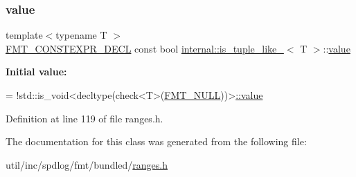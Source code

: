 \subsubsection{\texorpdfstring{value}{value}}
{\footnotesize\ttfamily template$<$typename T $>$ \\
\hyperlink{core_8h_af4388801466a5994a363d6005616371a}{F\+M\+T\+\_\+\+C\+O\+N\+S\+T\+E\+X\+P\+R\+\_\+\+D\+E\+CL} const bool \hyperlink{classinternal_1_1is__tuple__like__}{internal\+::is\+\_\+tuple\+\_\+like\+\_\+}$<$ T $>$\+::\hyperlink{classinternal_1_1value}{value}\hspace{0.3cm}{\ttfamily [static]}}

{\bfseries Initial value\+:}
\begin{DoxyCode}
=
    !std::is\_void<decltype(check<T>(\hyperlink{core_8h_af7f827e50dd7667484c279ac1d38f30b}{FMT\_NULL}))>\hyperlink{classinternal_1_1is__tuple__like___a2d78d2520f310397d1bad082dc3e3fa0}{::value}
\end{DoxyCode}


Definition at line 119 of file ranges.\+h.



The documentation for this class was generated from the following file\+:\begin{DoxyCompactItemize}
\item 
util/inc/spdlog/fmt/bundled/\hyperlink{ranges_8h}{ranges.\+h}\end{DoxyCompactItemize}
